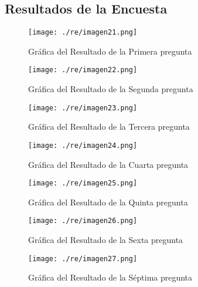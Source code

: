 \subsection{Resultados de la Encuesta}\label{section:Resultados}

\begin{figure}[H]
    \centering %
         \texttt{[image: ./re/imagen21.png]} 
    \caption{Gráfica del Resultado de la Primera pregunta \cite{}}
   \label{figure:Resultado 1} %
\end{figure}
\begin{figure}[H]
    \centering %
         \texttt{[image: ./re/imagen22.png]} 
    \caption{Gráfica del Resultado de la Segunda pregunta \cite{}}
   \label{figure:Resultado 2} %
\end{figure}
\begin{figure}[H]
    \centering %
         \texttt{[image: ./re/imagen23.png]} 
    \caption{Gráfica del Resultado de la Tercera pregunta \cite{}}
   \label{figure:Resultado 3} %
\end{figure}
\begin{figure}[H]
    \centering %
         \texttt{[image: ./re/imagen24.png]} 
    \caption{Gráfica del Resultado de la Cuarta pregunta \cite{}}
   \label{figure:Resultado 4} %
\end{figure}
\begin{figure}[H]
    \centering %
         \texttt{[image: ./re/imagen25.png]} 
    \caption{Gráfica del Resultado de la Quinta pregunta \cite{}}
   \label{figure:Resultado 5} %
\end{figure}
\begin{figure}[H]
    \centering %
         \texttt{[image: ./re/imagen26.png]} 
    \caption{Gráfica del Resultado de la Sexta pregunta \cite{}}
   \label{figure:Resultado 6} %
\end{figure}
\begin{figure}[H]
    \centering %
         \texttt{[image: ./re/imagen27.png]} 
    \caption{Gráfica del Resultado de la Séptima pregunta \cite{}}
   \label{figure:Resultado 7} %
\end{figure}
